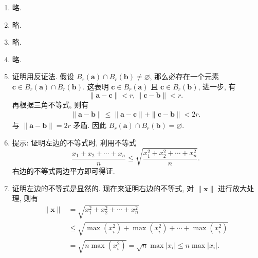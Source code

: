 % 
\begin{enumerate}
    \item %
        略.
    \item %
        略.
    \item %
        略.
    \item %
        略.
    \item %
        {\heiti 证明}\quad 用反证法. 假设 $B_r(\boldsymbol{a}) \cap B_r(\boldsymbol{b}) \neq \varnothing$, 那么必存在一个元素 $\boldsymbol{c} \in B_r(\boldsymbol{a}) \cap B_r(\boldsymbol{b})$.
        这表明 $\boldsymbol{c} \in B_r(\boldsymbol{a})$ 且 $\boldsymbol{c} \in B_r(\boldsymbol{b})$, 进一步, 有
        \[
            \| \boldsymbol{a} - \boldsymbol{c} \| < r, \| \boldsymbol{c} - \boldsymbol{b} \| < r. 
        \]
        再根据三角不等式, 则有
        \begin{align*}
            \| \boldsymbol{a} - \boldsymbol{b} \| \leqslant \| \boldsymbol{a} - \boldsymbol{c} \| + \| \boldsymbol{c} - \boldsymbol{b} \| < 2r.
        \end{align*}
        与 $\| \boldsymbol{a} - \boldsymbol{b} \| = 2r$ 矛盾. 因此 $B_r(\boldsymbol{a}) \cap B_r(\boldsymbol{b}) = \varnothing$.
    \item %
        提示: 证明左边的不等式时, 利用不等式
        \[
            \frac{x_1 + x_2 + \cdots + x_n}{n} \leqslant \sqrt{\frac{x_1^2 + x_2^2 + \cdots + x_n^2}{n}}.    
        \]
        右边的不等式两边平方即可得证.
    \item %
        {\heiti 证明}\quad 左边的不等式是显然的. 现在来证明右边的不等式, 对 $\| \boldsymbol{x} \|$ 进行放大处理, 则有
        \begin{align*}
            \| \boldsymbol{x} \| &= \sqrt{x_1^2 + x_2^2 + \cdots + x_n^2} \\
                                 &\leqslant \sqrt{\max(x_i^2) + \max(x_i^2) + \cdots + \max(x_i^2)} \\
                                 &= \sqrt{n\max(x_i^2)} = \sqrt{n}\max|x_i| \leqslant n\max|x_i|.  
        \end{align*}
\end{enumerate}
% 
